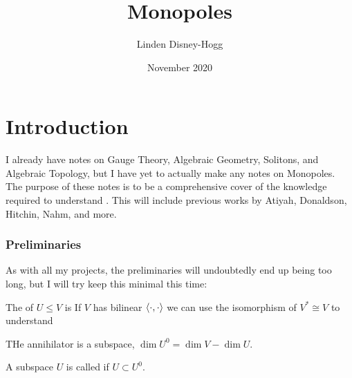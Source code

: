 \documentclass{article}
\title{Monopoles}
\author{Linden Disney-Hogg}
\date{November 2020}
\begin{document}
\maketitle
\tableofcontents

\part{Introduction}
I already have notes on Gauge Theory, Algebraic Geometry, Solitons, and Algebraic Topology, but I have yet to actually make any notes on Monopoles. The purpose of these notes is to be a comprehensive cover of the knowledge required to understand \cite{Braden2018}. This will include previous works by Atiyah, Donaldson, Hitchin, Nahm, and more.
\section{Preliminaries}
As with all my projects, the preliminaries will undoubtedly end up being too long, but I will try keep this minimal this time: 
\begin{definition}
	The  of $U \leq V$ is 
If $V$ has bilinear $\left\langle \cdot, \cdot \right\rangle$ we can use the isomorphism of $V^\ast\cong V$ to understand 
\end{definition}

\begin{lemma}
	THe annihilator is a subspace, $\dim U^0 = \dim V  - \dim U$. 
\end{lemma}

\begin{definition}
	A subspace $U$ is called  if $U \subset U^0$. 
\end{definition}
\end{document}
